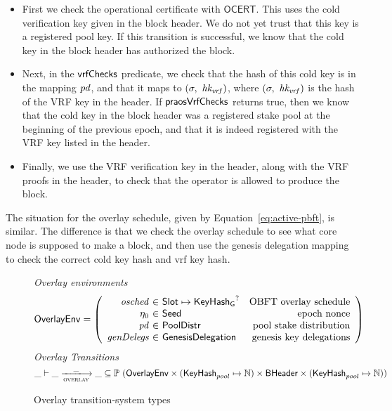 \begin{itemize}
  \item First we check the operational certificate with $\mathsf{OCERT}$.
  This uses the cold verification key given in the block header.
  We do not yet trust that this key is a registered pool key.
  If this transition is successful, we know that the cold key in the block header has authorized
  the block.
\item  Next, in the $\mathsf{vrfChecks}$ predicate, we check that the hash of this cold key is in the
  mapping $\mathit{pd}$, and that it maps to $(\sigma,~\mathit{hk_{vrf}})$, where
  $(\sigma,~\mathit{hk_{vrf}})$ is the hash of the VRF key in the header.
  If $\mathsf{praosVrfChecks}$ returns true, then we know that the cold key in the block header was a
  registered stake pool at the beginning of the previous epoch, and that it is indeed registered
  with the VRF key listed in the header.
\item Finally, we use the VRF verification key in the header, along with the VRF proofs in the
  header, to check that the operator is allowed to produce the block.
\end{itemize}
The situation for the overlay schedule, given by Equation~\ref{eq:active-pbft}, is similar.
The difference is that we check the overlay schedule to see what core node is
supposed to make a block, and then use the genesis delegation mapping to
check the correct cold key hash and vrf key hash.

\begin{figure}
  \emph{Overlay environments}
  \begin{equation*}
    \OverlayEnv =
    \left(
      \begin{array}{r@{~\in~}lr}
        \var{osched} & \Slot\mapsto\KeyHashGen^? & \text{OBFT overlay schedule} \\
        \eta_0 & \Seed & \text{epoch nonce} \\
        \var{pd} & \PoolDistr & \text{pool stake distribution} \\
        \var{genDelegs} & \GenesisDelegation & \text{genesis key delegations} \\
      \end{array}
    \right)
  \end{equation*}
  \emph{Overlay Transitions}
  \begin{equation*}
    \_ \vdash \var{\_} \trans{overlay}{\_} \var{\_} \subseteq
    \powerset (\OverlayEnv \times (\KeyHash_{pool} \mapsto \N) \times \BHeader \times
    (\KeyHash_{pool} \mapsto \N))
  \end{equation*}
  \caption{Overlay transition-system types}
  \label{fig:ts-types:overlay}
\end{figure}

